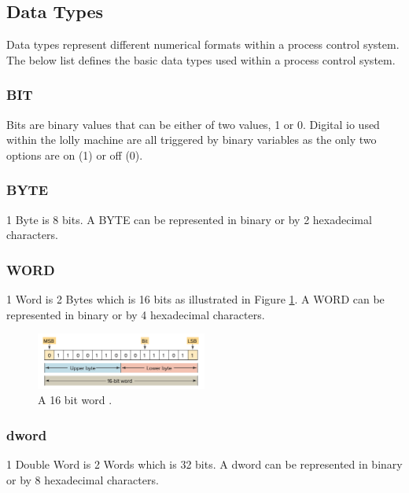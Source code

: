\subsection{Data Types}
    Data types represent different numerical formats within a process control system. The below list defines the basic data types used within a process control system.
    
    \subsubsection{BIT}
        Bits are binary values that can be either of two values, 1 or 0. Digital \acrshort{io} used within the lolly machine are all triggered by binary variables as the only two options are on (1) or off (0). 
    
    \subsubsection{BYTE}
        1 Byte is 8 bits. A BYTE can be represented in binary or by 2 hexadecimal characters.
    
    \subsubsection{WORD}
        1 Word is 2 Bytes which is 16 bits as illustrated in Figure \ref{fig:word}. A WORD can be represented in binary or by 4 hexadecimal characters.
        \begin{figure}[H]
            \centering
            \includegraphics[width = 0.5\textwidth]{2_images/word.png}
            \caption{A 16 bit word \cite{petruzella2017programmable}.}
            \label{fig:word}
        \end{figure}           
        
    
    \subsubsection{\acrfull{dword}}
        1 Double Word is 2 Words which is 32 bits. A \acrshort{dword} can be represented in binary or by 8 hexadecimal characters.
 \newpage   
